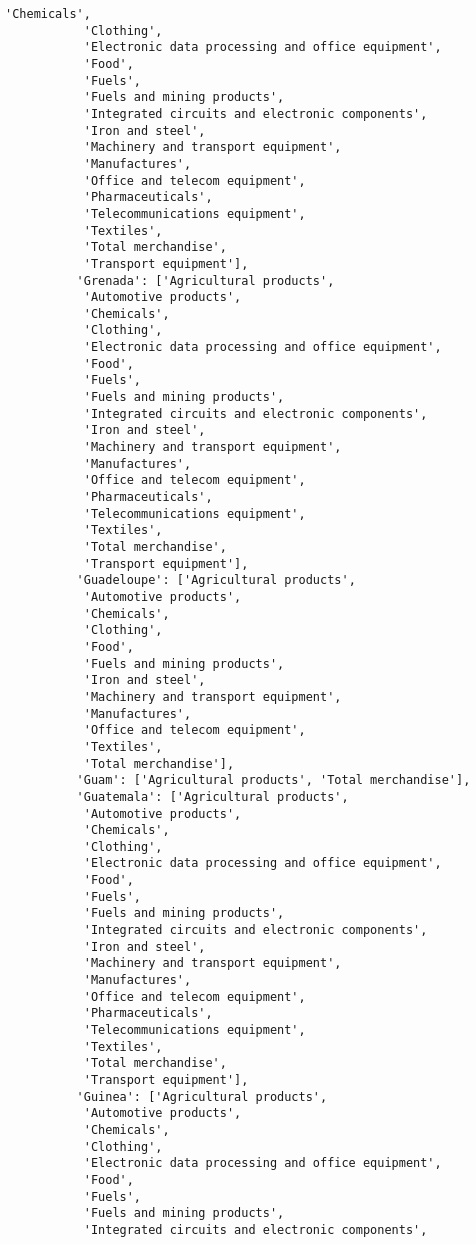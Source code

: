\documentclass[11pt]{article}
\begin{document}
\begin{Verbatim}[commandchars=\\\{\}]
           'Chemicals',
           'Clothing',
           'Electronic data processing and office equipment',
           'Food',
           'Fuels',
           'Fuels and mining products',
           'Integrated circuits and electronic components',
           'Iron and steel',
           'Machinery and transport equipment',
           'Manufactures',
           'Office and telecom equipment',
           'Pharmaceuticals',
           'Telecommunications equipment',
           'Textiles',
           'Total merchandise',
           'Transport equipment'],
          'Grenada': ['Agricultural products',
           'Automotive products',
           'Chemicals',
           'Clothing',
           'Electronic data processing and office equipment',
           'Food',
           'Fuels',
           'Fuels and mining products',
           'Integrated circuits and electronic components',
           'Iron and steel',
           'Machinery and transport equipment',
           'Manufactures',
           'Office and telecom equipment',
           'Pharmaceuticals',
           'Telecommunications equipment',
           'Textiles',
           'Total merchandise',
           'Transport equipment'],
          'Guadeloupe': ['Agricultural products',
           'Automotive products',
           'Chemicals',
           'Clothing',
           'Food',
           'Fuels and mining products',
           'Iron and steel',
           'Machinery and transport equipment',
           'Manufactures',
           'Office and telecom equipment',
           'Textiles',
           'Total merchandise'],
          'Guam': ['Agricultural products', 'Total merchandise'],
          'Guatemala': ['Agricultural products',
           'Automotive products',
           'Chemicals',
           'Clothing',
           'Electronic data processing and office equipment',
           'Food',
           'Fuels',
           'Fuels and mining products',
           'Integrated circuits and electronic components',
           'Iron and steel',
           'Machinery and transport equipment',
           'Manufactures',
           'Office and telecom equipment',
           'Pharmaceuticals',
           'Telecommunications equipment',
           'Textiles',
           'Total merchandise',
           'Transport equipment'],
          'Guinea': ['Agricultural products',
           'Automotive products',
           'Chemicals',
           'Clothing',
           'Electronic data processing and office equipment',
           'Food',
           'Fuels',
           'Fuels and mining products',
           'Integrated circuits and electronic components',

\end{Verbatim}
\end{document}
